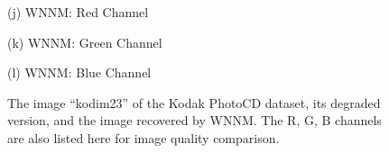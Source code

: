 \documentclass[10pt,twocolumn,letterpaper,sort&compress]{article}
\begin{document}
\begin{figure}
{\begin{minipage}[t]{0.25\textwidth}
{\footnotesize (j) WNNM: Red Channel}
\end{minipage}
\begin{minipage}[t]{0.25\textwidth}
\centering
{}
{\footnotesize (k) WNNM: Green Channel}
\end{minipage}
\begin{minipage}[t]{0.25\textwidth}
\centering
{}
{\footnotesize (l) WNNM: Blue Channel}
\end{minipage}
}\vspace{-1mm}
\caption{The image ``kodim23'' of the Kodak PhotoCD dataset, its degraded version, and the image recovered by WNNM. The R, G, B channels are also listed here for image quality comparison.}
\label{fa}
\vspace{-2mm}
\end{figure}
\end{document}
